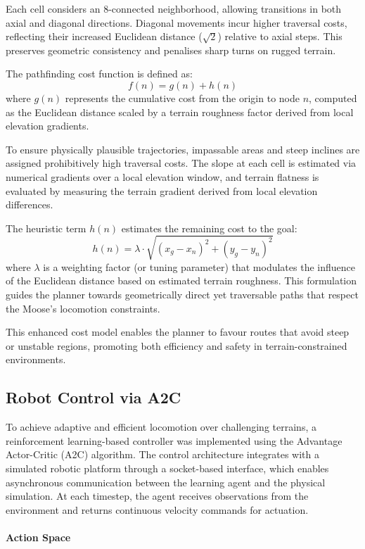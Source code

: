 \documentclass[conference]{IEEEtran}
\begin{document}
Each cell considers an 8-connected neighborhood, allowing transitions in both axial and diagonal directions. Diagonal movements incur higher traversal costs, reflecting their increased Euclidean distance ($\sqrt{2}$) relative to axial steps. This preserves geometric consistency and penalises sharp turns on rugged terrain.

The pathfinding cost function is defined as:
\[
f(n) = g(n) + h(n)
\]
where $g(n)$ represents the cumulative cost from the origin to node $n$, computed as the Euclidean distance scaled by a terrain roughness factor derived from local elevation gradients. 

To ensure physically plausible trajectories, impassable areas and steep inclines are assigned prohibitively high traversal costs. The slope at each cell is estimated via numerical gradients over a local elevation window, and terrain flatness is evaluated by measuring the terrain gradient derived from local elevation differences.

The heuristic term \(h(n)\) estimates the remaining cost to the goal:
\[
h(n) = \lambda \cdot \sqrt{(x_g - x_n)^2 + (y_g - y_n)^2}
\]
where \(\lambda\) is a weighting factor (or tuning parameter) that modulates the influence of the Euclidean distance based on estimated terrain roughness. This formulation guides the planner towards geometrically direct yet traversable paths that respect the Moose’s locomotion constraints.

This enhanced cost model enables the planner to favour routes that avoid steep or unstable regions, promoting both efficiency and safety in terrain-constrained environments.

\subsection{Robot Control via A2C}

To achieve adaptive and efficient locomotion over challenging terrains, a reinforcement learning-based controller was implemented using the Advantage Actor-Critic (A2C) algorithm. The control architecture integrates with a simulated robotic platform through a socket-based interface, which enables asynchronous communication between the learning agent and the physical simulation. At each timestep, the agent receives observations from the environment and returns continuous velocity commands for actuation.

\paragraph{Action Space}
\end{document}
